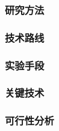 \justifying
\NSFCBodyText

\subsubsection{研究方法}

\subsubsection{技术路线}

\subsubsection{实验手段}

\subsubsection{关键技术}

\subsubsection{可行性分析}
